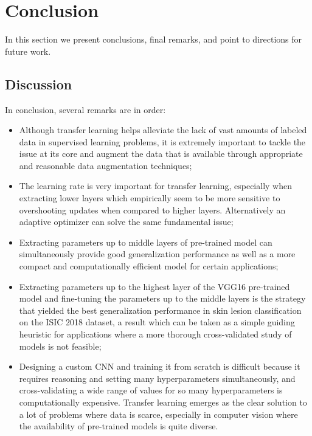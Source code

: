 \chapter{Conclusion}
\label{chapter:conclusion}

In this section we present conclusions, final remarks, and point to directions for future work.

\section{Discussion}

In conclusion, several remarks are in order:

\begin{itemize}
    \item Although transfer learning helps alleviate the lack of vast amounts of labeled data in supervised learning problems, it is extremely important to tackle the issue at its core and augment the data that is available through appropriate and reasonable data augmentation techniques;
    \item The learning rate is very important for transfer learning, especially when extracting lower layers which empirically seem to be more sensitive to overshooting updates when compared to higher layers. Alternatively an adaptive optimizer can solve the same fundamental issue;
    \item Extracting parameters up to middle layers of pre-trained model can simultaneously provide good generalization performance as well as a more compact and computationally efficient model for certain applications;
    \item Extracting parameters up to the highest layer of the VGG16 pre-trained model and fine-tuning the parameters up to the middle layers is the strategy that yielded the best generalization performance in skin lesion classification on the ISIC 2018 dataset, a result which can be taken as a simple guiding heuristic for applications where a more thorough cross-validated study of models is not feasible;
    \item Designing a custom \ac{CNN} and training it from scratch is difficult because it requires reasoning and setting many hyperparameters simultaneously, and cross-validating a wide range of values for so many hyperparameters is computationally expensive. Transfer learning emerges as the clear solution to a lot of problems where data is scarce, especially in computer vision where the availability of pre-trained models is quite diverse.
\end{itemize}

